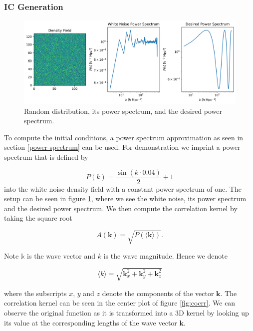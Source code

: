 \documentclass{article}
\begin{document}
\subsubsection{IC Generation}
\label{IC-GEN}


\begin{figure}[h]
    \centering
    \includegraphics[width=0.7\linewidth]{img/IC_sine_setup.png}
   \caption{Random distribution, its power spectrum, and the desired power spectrum.}
\label{fig:random}
\end{figure}

To compute the initial conditions, a power spectrum approximation as seen in section \ref{power-spectrum} can be used. For demonstration we imprint a power spectrum that is defined by

\begin{equation}
    P(k) = \frac{\sin(k \cdot 0.04)}{2} + 1
\end{equation}
into the white noise density field with a constant power spectrum of one. The setup can be seen in figure \ref{fig:random}, where we see the white noise, its power spectrum and the desired power spectrum. We then compute the correlation kernel by taking the square root \citep{prunet2008initial}

\begin{equation}
    A(\mathbf{k}) = \sqrt{P(\langle \mathbf{k} \rangle)}.
\end{equation}

Note $\mathbb{k}$ is the wave vector and $k$ is the wave magnitude. Hence we denote

\begin{equation}
    \langle k \rangle = \sqrt{\mathbf{k}_x^2 + \mathbf{k}_y^2 + \mathbf{k}_z^2}
\end{equation}

where the subscripts $x$, $y$ and $z$ denote the components of the vector $\mathbf{k}$. The correlation kernel can be seen in the center plot of figure \ref{fig:cocrr}. We can observe the original function as it is transformed into a 3D kernel by looking up its value at the corresponding lengths of the wave vector $\mathbf{k}$.
\end{document}
